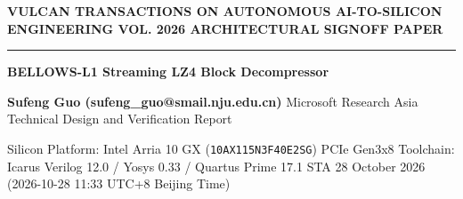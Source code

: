 \documentclass[11pt,a4paper]{article}
\begin{document}
{\scriptsize\sffamily\textcolor{vulcan}{\textbf{VULCAN TRANSACTIONS ON AUTONOMOUS AI-TO-SILICON ENGINEERING \hfill VOL. 2026 \textperiodcentered{} ARCHITECTURAL SIGNOFF PAPER}}\par}

\vspace{1pt}\textcolor{vulcan}{\rule{\textwidth}{1.2pt}}\vspace{4pt}

\begin{center}

{\sffamily\LARGE\bfseries BELLOWS-L1 Streaming LZ4 Block Decompressor\par}\vspace{3pt}

{\small\sffamily\textbf{Sufeng Guo (\allowbreak{}sufeng\_\allowbreak{}guo@smail.nju.edu.cn)\allowbreak{}} \textperiodcentered{} Microsoft Research Asia \textperiodcentered{} Technical Design and Verification Report\par}\vspace{1pt}

{\scriptsize\sffamily\textcolor{black!75}{Silicon Platform: Intel Arria 10 GX (\texttt{10AX115N3F40E2SG}) PCIe Gen3x8 \textperiodcentered{} Toolchain: Icarus Verilog 12.0 / Yosys 0.33 / Quartus Prime 17.1 STA \textperiodcentered{} 28 October 2026 (\allowbreak{}2026-10-28 11:33 UTC+\allowbreak{}8 Beijing Time)\allowbreak{}}\par}

\end{center}\vspace{2pt}
\end{document}
